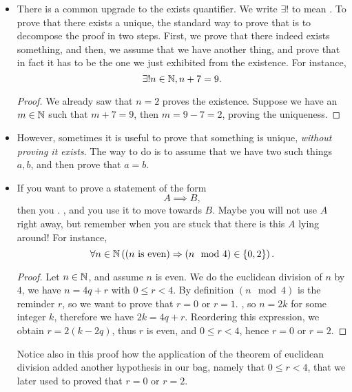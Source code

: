 \begin{itemize}
    \item There is a common upgrade to the exists quantifier. We write \( \exists! \) to mean . To prove that there exists a unique, the standard way to prove that is to decompose the proof in two steps. First, we prove that there indeed exists something, and then, we assume that we have another thing, and prove that in fact it has to be the one we just exhibited from the existence. For instance,
    \begin{equation*}
        \exists! n \in \mathbb{N}, n + 7 = 9.
    \end{equation*}
    \begin{proof}
        We already saw that \( n = 2 \) proves the existence. Suppose we have an \( m \in \mathbb{N} \) such that \( m + 7 = 9 \), then \( m = 9 - 7 = 2 \), proving the uniqueness.
    \end{proof}

    \item However, sometimes it is useful to prove that something is unique, \textit{without proving it exists}. The way to do is to assume that we have two such things \( a, b \), and then prove that \( a = b \).
    
    \item If you want to prove a statement of the form
    \begin{equation*}
        A \implies B,
    \end{equation*}
    then you . , and you use it to move towards \( B \). Maybe you will not use \( A \) right away, but remember when you are stuck that there is this \( A \) lying around! For instance,
    \begin{equation*}
        \forall n \in \mathbb{N} \left((n \text{ is even}) \Rightarrow (n \mod 4) \in \{ 0, 2 \} \right).
    \end{equation*}
    \begin{proof}
        Let \( n \in \mathbb{N} \), and assume \( n \) is even. We do the euclidean division of \( n \) by \( 4 \), we have \( n = 4q + r \) with \( 0 \le r < 4 \). By definition \( (n \mod 4) \) is the reminder \( r \), so we want to prove that \( r = 0 \) or \( r = 1 \). , so \( n = 2k \) for some integer \( k \), therefore we have \( 2k = 4q + r \). Reordering this expression, we obtain \( r = 2(k-2q) \), thus \( r \) is even, and \( 0 \le r < 4 \), hence \( r = 0 \) or \( r = 2 \).
    \end{proof}
    Notice also in this proof how the application of the theorem of euclidean division added another hypothesis in our bag, namely that \( 0 \le r < 4 \), that we later used to proved that \( r = 0 \) or \( r = 2 \).


\end{itemize}
